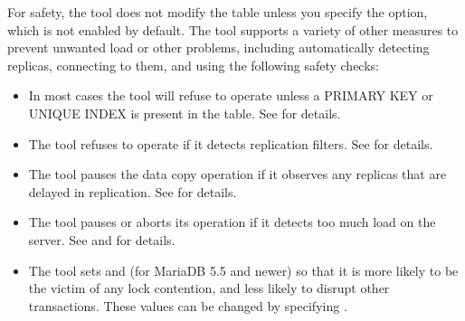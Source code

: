 \documentclass[letterpaper,10pt,english]{sphinxmanual}
\begin{document}
For safety, the tool does not modify the table unless you specify the
{\hyperref[\detokenize{mariadb-schema-change:cmdoption-mariadb-schema-change-execute}]{}} option, which is not enabled by default.  The tool supports a
variety of other measures to prevent unwanted load or other problems, including
automatically detecting replicas, connecting to them, and using the following
safety checks:
\begin{itemize}
\item {} 
In most cases the tool will refuse to operate unless a PRIMARY KEY or UNIQUE INDEX is
present in the table. See {\hyperref[\detokenize{mariadb-schema-change:cmdoption-mariadb-schema-change-alter}]{}} for details.

\item {} 
The tool refuses to operate if it detects replication filters. See
 for details.

\item {} 
The tool pauses the data copy operation if it observes any replicas that are
delayed in replication. See {\hyperref[\detokenize{mariadb-schema-change:cmdoption-mariadb-schema-change-max-lag}]{}} for details.

\item {} 
The tool pauses or aborts its operation if it detects too much load on the
server. See {\hyperref[\detokenize{mariadb-schema-change:cmdoption-mariadb-schema-change-max-load}]{}} and {\hyperref[\detokenize{mariadb-schema-change:cmdoption-mariadb-schema-change-critical-load}]{}} for details.

\item {} 
The tool sets  and (for MariaDB 5.5 and newer)
 so that it is more likely to be the victim of any
lock contention, and less likely to disrupt other transactions.  These
values can be changed by specifying {\hyperref[\detokenize{mariadb-schema-change:cmdoption-mariadb-schema-change-set-vars}]{}}.


\end{itemize}
\end{document}
